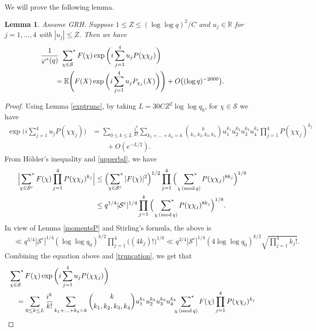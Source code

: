 \documentclass[12pt, reqno]{amsart}
\renewcommand{\pmod}[1]{\,(\mathrm{mod}\,#1)}
\newcommand{\E}{\mathbb{E}}
\newtheorem{lemma}[theorem]{Lemma}
\numberwithin{equation}{section}
\numberwithin{theorem}{section}
\numberwithin{equation}{section}
\def\sumstar{\sideset{}{^*}\sum}
\begin{document}
We will prove the following lemma.

\begin{lemma}
\label{random_chi}
Assume GRH. Suppose $1\leq Z \leq (\log\log q)^2/C$ and $u_j \in \mathbb{R}$ for $j=1,\ldots, 4$ with $|u_j| \leq Z$. Then we have 
\begin{align*}
   & \frac{1}{\varphi^{*}(q)}\ \sumstar_{\chi \in \mathcal{S}} F(\chi)  
\exp\bigg(  i\sum_{j=1}^4 u_jP(\chi\chi_j)\bigg) \\
&\qquad= \E \Bigg( F(X) \exp\bigg(  i\sum_{j=1}^4 u_jP_{\chi_j}(X)\bigg)\Bigg) +O\big(  (\log q)^{-2000}\big).
\end{align*}
\end{lemma}
\begin{proof}
    
Using Lemma \ref{exptrunc}, by taking $L= 30CZ^2 \log \log q_0$, for $\chi \in \mathcal{S}$ we have 
    \begin{align} \label{truncation}
    \exp\bigg(  i\sum_{j=1}^4 u_jP(\chi\chi_j)\bigg)& = \sum_{0 \leq k \leq L} \frac{i^k}{k!} \sum_{k_1+\ldots +k_4=k} {k \choose k_1,k_2,k_3,k_4} u_1^{k_1} u_2^{k_2} u_3^{k_3} u_4^{k_4} \prod_{j=1}^4 P(\chi \chi_j)^{k_j}\\
    &\qquad+O(e^{-L/2}).\nonumber
    \end{align}
 From H\"older's inequality and \eqref{upperbd}, we have
\begin{align*}
 \Big|\sumstar_{\chi \in \mathcal{S}^c} F(\chi)  \prod_{j=1}^4 P(\chi \chi_j)^{k_j} \Big| &\leq \Big( \sumstar_{\chi \in \mathcal{S}^c} |F(\chi)|^2 \Big)^{1/2} \prod_{j=1}^4 \Big(\ \sumstar_{\chi \pmod q} P(\chi \chi_j)^{8k_j} \Big)^{1/8}  \\
 & \leq q^{1/4} |\mathcal{S}^c|^{1/4} \prod_{j=1}^4 \Big(\ \sumstar_{\chi \pmod q} P(\chi \chi_j)^{8k_j} \Big)^{1/8}.
\end{align*}  
In view of Lemma \ref{momentsP} and Stirling's formula, the above is 
\begin{align*}
    & \ll q^{3/4} |\mathcal{S}^c|^{1/4}(\log\log q_0)^{k/2} \prod_{j=1}^4  \big((4k_j)!\big)^{1/8}  \ll q^{3/4} |\mathcal{S}^c|^{1/4} (4 \log \log q_0)^{k/2} \sqrt{ \prod_{j=1}^4k_j!}.
\end{align*}
Combining the equation above and \eqref{truncation}, we get that 
\begin{align*}
 &   \sumstar_{\chi \in \mathcal{S}}  F(\chi)  
\exp\bigg(  i\sum_{j=1}^4 u_jP(\chi\chi_j)\bigg) \\
&\quad= \sum_{0 \leq k \leq L} \frac{i^k}{k!} \sum_{k_1+\ldots +k_4=k} {k \choose k_1,k_2,k_3,k_4} u_1^{k_1} u_2^{k_2} u_3^{k_3} u_4^{k_4} \sumstar_{\chi \pmod q} F(\chi)  \prod_{j=1}^4 P(\chi \chi_j)^{k_j}\\

\end{align*}
\end{proof}
\end{document}
